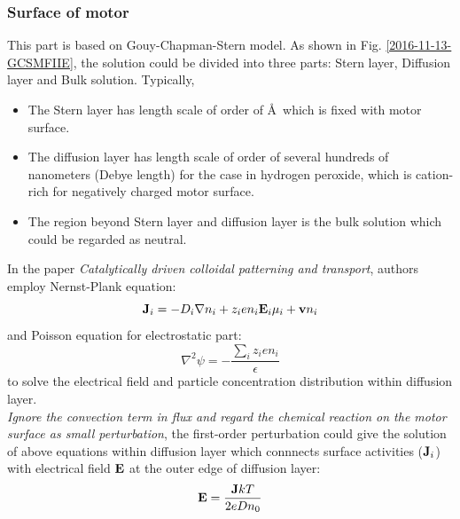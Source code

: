 \documentclass[fontsize=11pt, %
                             paper=a4, %
                             twoside, %
                             captions=tableheading,
                             index=totoc,
                             hyperref]{labbook}
\begin{document}
\begin{addmargin}[4cm]{0cm}
\subsubsection{Surface of motor}
This part is based on Gouy-Chapman-Stern model. As shown in Fig. \ref{2016-11-13-GCSMFIIE}, the solution could be divided into three parts: Stern layer, Diffusion layer and Bulk solution. Typically, 
\begin{itemize}
\item The Stern layer has length scale of order of \AA \ which is fixed with motor surface.
\item The diffusion layer has length scale of order of several hundreds of nanometers (Debye length) for the case in hydrogen peroxide, which is cation-rich for negatively charged motor surface. 
\item The region beyond Stern layer and diffusion layer is the bulk solution which could be regarded as neutral.
\end{itemize}
In the paper \emph{Catalytically driven colloidal patterning and transport}\cite{Kline2006}, authors employ Nernst-Plank equation:
\begin{equation}
\mathbf{J}_i=-D_i \nabla n_i + z_ien_i\mathbf{E}_i \mu_i + \mathbf{v} n_i
\end{equation}
and Poisson equation for electrostatic part:
\begin{equation}
\nabla^2\psi=-\frac{\sum_i z_i e n_i}{\epsilon}
\end{equation}
to solve the electrical field and particle concentration distribution within diffusion layer. \\
\emph{Ignore the convection term in flux and regard the chemical reaction on the motor surface as small perturbation}, the first-order perturbation could give the solution of above equations within diffusion layer which connnects surface activities ($\mathbf{J}_i$) with electrical field $\mathbf{E}$ at the outer edge of diffusion layer:
\begin{equation}
\mathbf{E} = \frac{\mathbf{J} k T}{2e D n_0}
\end{equation}

\end{addmargin}
\end{document}
